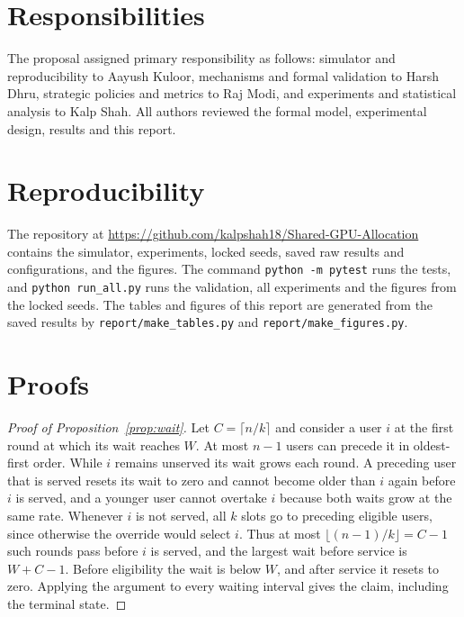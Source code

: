 \documentclass{article}
\theoremstyle{plain}
\theoremstyle{definition}
\begin{document}
\section*{Responsibilities}
The proposal assigned primary responsibility as follows: simulator and reproducibility to Aayush Kuloor, mechanisms and formal validation to Harsh Dhru, strategic policies and metrics to Raj Modi, and experiments and statistical analysis to Kalp Shah.
All authors reviewed the formal model, experimental design, results and this report.

\section*{Reproducibility}
The repository at \url{https://github.com/kalpshah18/Shared-GPU-Allocation} contains the simulator, experiments, locked seeds, saved raw results and configurations, and the figures.
The command \texttt{python -m pytest} runs the tests, and \texttt{python run\_all.py} runs the validation, all experiments and the figures from the locked seeds.
The tables and figures of this report are generated from the saved results by \texttt{report/make\_tables.py} and \texttt{report/make\_figures.py}.




\appendix
\section{Proofs}
\label{app:proofs}

\begin{proof}[Proof of Proposition~\ref{prop:wait}]
Let $C=\lceil n/k\rceil$ and consider a user $i$ at the first round at which its wait reaches $W$.
At most $n-1$ users can precede it in oldest-first order.
While $i$ remains unserved its wait grows each round.
A preceding user that is served resets its wait to zero and cannot become older than $i$ again before $i$ is served, and a younger user cannot overtake $i$ because both waits grow at the same rate.
Whenever $i$ is not served, all $k$ slots go to preceding eligible users, since otherwise the override would select $i$.
Thus at most $\lfloor (n-1)/k\rfloor=C-1$ such rounds pass before $i$ is served, and the largest wait before service is $W+C-1$.
Before eligibility the wait is below $W$, and after service it resets to zero.
Applying the argument to every waiting interval gives the claim, including the terminal state.
\end{proof}
\end{document}
